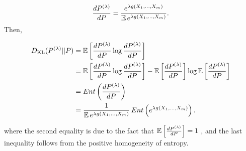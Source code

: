 \documentclass{article}
\begin{document}
\begin{equation*}
\frac{dP^{(\lambda)}}{dP} = \frac{e^{\lambda g(X_1, \dots, X_m)}}{\mathbb{E}\,e^{\lambda g(X_1, \dots, X_m)}}.
\end{equation*}
 Then,


\begin{align*}
D_{\mathrm{KL}}(P^{(\lambda)}||P) &= \mathbb{E}\left[\frac{dP^{(\lambda)}}{dP} \log \frac{dP^{(\lambda)}}{dP}\right] \\
&= \mathbb{E}\left[\frac{dP^{(\lambda)}}{dP} \log \frac{dP^{(\lambda)}}{dP}\right] - \mathbb{E}\left[\frac{dP^{(\lambda)}}{dP}\right]\log \mathbb{E} \left[\frac{dP^{(\lambda)}}{dP}\right]\\
&= Ent\left(\frac{dP^{(\lambda)}}{dP}\right)\\
&= \frac{1}{\mathbb{E}\,e^{\lambda g(X_1, \dots, X_m)}}\, Ent\left(e^{\lambda g(X_1, \dots, X_m)}\right).
\end{align*}

where the second equality is due to the fact that  $\mathbb{E}  \left[ \frac{dP^{(\lambda)}}{dP} \right] = 1$ , and the last inequality follows from the positive homogeneity of entropy.



\printbibliography
\end{document}
